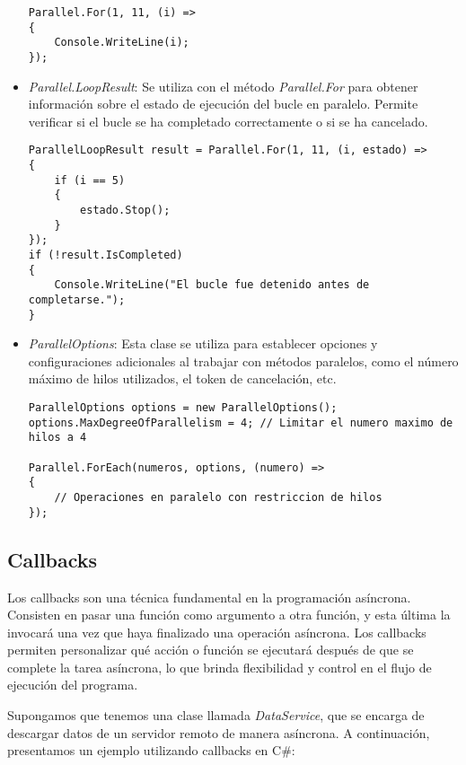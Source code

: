 \documentclass[executivepaper]{article}
\begin{document}
\begin{itemize}
\begin{lstlisting}
Parallel.For(1, 11, (i) =>
{
    Console.WriteLine(i);
});
\end{lstlisting}

    \item \emph{Parallel.LoopResult}: Se utiliza con el método \emph{Parallel.For} para obtener información sobre el estado de ejecución del bucle en paralelo. Permite verificar si el bucle se ha completado correctamente o si se ha cancelado.
    
\begin{lstlisting}
ParallelLoopResult result = Parallel.For(1, 11, (i, estado) =>
{
    if (i == 5)
    {
        estado.Stop();
    }
});
if (!result.IsCompleted)
{
    Console.WriteLine("El bucle fue detenido antes de completarse.");
}
\end{lstlisting}

    \item \emph{ParallelOptions}: Esta clase se utiliza para establecer opciones y configuraciones adicionales al trabajar con métodos paralelos, como el número máximo de hilos utilizados, el token de cancelación, etc.

\begin{lstlisting}
ParallelOptions options = new ParallelOptions();
options.MaxDegreeOfParallelism = 4; // Limitar el numero maximo de hilos a 4

Parallel.ForEach(numeros, options, (numero) =>
{
    // Operaciones en paralelo con restriccion de hilos
});
\end{lstlisting}

\end{itemize}

\subsection{Callbacks}

Los callbacks son una técnica fundamental en la programación asíncrona. Consisten en pasar una función como argumento a otra función, y esta última la invocará una vez que haya finalizado una operación asíncrona. Los callbacks permiten personalizar qué acción o función se ejecutará después de que se complete la tarea asíncrona, lo que brinda flexibilidad y control en el flujo de ejecución del programa.

Supongamos que tenemos una clase llamada \emph{DataService}, que se encarga de descargar datos de un servidor remoto de manera asíncrona. A continuación, presentamos un ejemplo utilizando callbacks en C\#:
\end{document}
